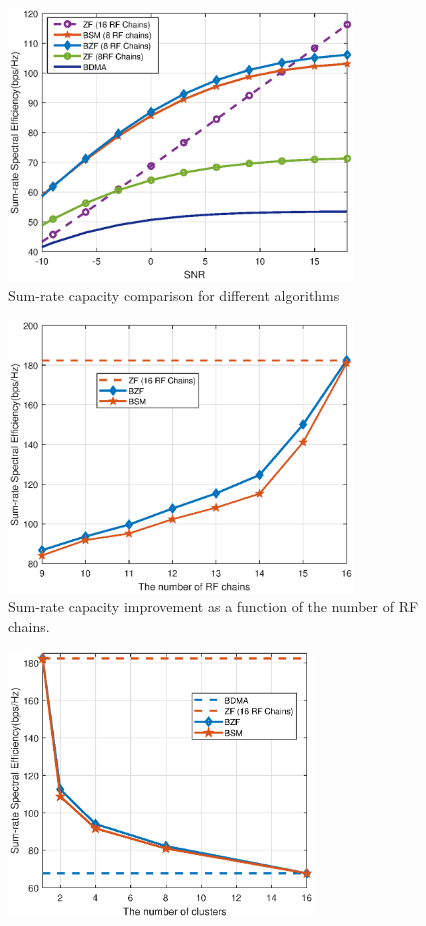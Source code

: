 \documentclass[conference]{IEEEtran}
\begin{document}
{\begin{figure}[ht]
	\begin{center}
		\includegraphics[width=3.6in]{Figure/comp1path.eps}
		\caption{Sum-rate capacity comparison for different algorithms}\label{fig:MultiuserGain}
	\end{center}
\end{figure}
\begin{figure}[ht]
	\begin{center}
		\includegraphics[width=3.6in]{Figure/differentRF1path.eps}
		\caption{Sum-rate capacity improvement as a function of the number of RF chains.}\label{fig:RFchains}
	\end{center}
\end{figure}
\begin{figure}[ht]
	\begin{center}
		\includegraphics[width=3.2in]{Figure/differentK1path.eps}

\end{center}
\end{figure}}
\end{document}
